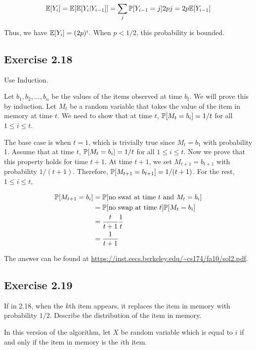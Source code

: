 \begin{equation*}
	\E[Y_i] = \E[\E[Y_i | Y_{i-1}]] = 
	\sum_{j} \P[Y_{i-1} = j] 2pj = 2p \E[Y_{i-1}]
\end{equation*}

Thus, we have $\E[Y_i] = (2p)^i$. When $p < 1/2$, this probability is bounded.

\subsection*{Exercise 2.18}

Use Induction. 

Let $b_1, b_2,...,b_n$ be the values of the items observed at time $b_t$. We will prove this by
induction. Let $M_t$ be a random variable that takes the value of the item in memory at time $t$.
We need to show that at time $t$, $\P[M_t = b_i] = 1/t$ for all $1 \leq i \leq t$.

The base case is when $t = 1$, which is trivially true since $M_t = b_1$ with probability 1. Assume
that at time $t$, $\P[M_t = b_i] = 1/t$ for all $1 \leq i \leq t$. Now we prove that this
property holds for time $t + 1$. At time $t+1$, we set $M_{t+1} = b_{t+1}$ with probability $1/(t+1)$.
Therefore, $\P[M_{t+1} = b_{t+1}] = 1/(t+1)$. For the rest, $1 \leq i \leq t$,

\begin{equation*}
\begin{split}
\P[M_{t+1} = b_i] & = \P[\text{no swat at time }t \text{ and } M_t = b_i] \\
& = \P[\text{no swap at time } t] \P[M_t = b_i] \\
& = \frac{t}{t+1} \frac{1}{t} \\
& = \frac{1}{t+1}
\end{split}
\end{equation*}

The answer can be found at \url{https://inst.eecs.berkeley.edu/~cs174/fa10/sol2.pdf}.

\subsection*{Exercise 2.19}

If in 2.18, when the $k$th item appears, it replaces the item in memory with probability $1/2$.
Describe the distribution of the item in memory.

In this version of the algorithm, let $X$ be random variable which is equal to $i$ if and only if the item
in memory is the $i$th item.

